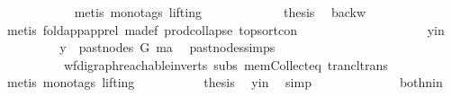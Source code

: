 \begin{isabellebody}
\ \ \ \ \ \ \ \ \ \ \isamarkupfalse%
\ {\isacharparenleft}{\kern0pt}metis\ {\isacharparenleft}{\kern0pt}mono{\isacharunderscore}{\kern0pt}tags{\isacharcomma}{\kern0pt}\ lifting{\isacharparenright}{\kern0pt}{\isacharparenright}{\kern0pt}\ \isanewline
\ \ \ \ \ \ \ \ \isamarkupfalse%
\ \isamarkupfalse%
\ {\isacharquery}{\kern0pt}thesis\ \isamarkupfalse%
\ backw\isanewline
\ \ \ \ \ \ \ \ \ \ \isamarkupfalse%
\ {\isacharparenleft}{\kern0pt}metis\ fold{\isacharunderscore}{\kern0pt}app{\isacharunderscore}{\kern0pt}app{\isacharunderscore}{\kern0pt}rel\ ma{\isacharunderscore}{\kern0pt}def\ prod{\isachardot}{\kern0pt}collapse\ top{\isacharunderscore}{\kern0pt}sort{\isacharunderscore}{\kern0pt}con{\isacharparenright}{\kern0pt}\ \isanewline
\ \ \ \ \ \ \isamarkupfalse%
\isanewline
\ \ \ \ \isamarkupfalse%
\isanewline
\ \ \ \ \ \ \isamarkupfalse%
\ y{\isacharunderscore}{\kern0pt}in\isanewline
\ \ \ \ \ \ \isamarkupfalse%
\ \isamarkupfalse%
\ {\isachardoublequoteopen}y\ {\isasymin}\ past{\isacharunderscore}{\kern0pt}nodes\ G\ ma{\isachardoublequoteclose}\ \isamarkupfalse%
\ past{\isacharunderscore}{\kern0pt}nodes{\isachardot}{\kern0pt}simps\ \isamarkupfalse%
\ {}{\isacharparenleft}{\kern0pt}{}{\isacharcomma}{\kern0pt}{}{\isacharparenright}{\kern0pt}\isanewline
\ \ \ \ \ \ \ \ \ \ wf{\isacharunderscore}{\kern0pt}digraph{\isachardot}{\kern0pt}reachable{}{\isacharunderscore}{\kern0pt}in{\isacharunderscore}{\kern0pt}verts{\isacharparenleft}{\kern0pt}{}{\isacharparenright}{\kern0pt}\ subs\ mem{\isacharunderscore}{\kern0pt}Collect{\isacharunderscore}{\kern0pt}eq\ trancl{\isacharunderscore}{\kern0pt}trans\isanewline
\ \ \ \ \ \ \ \ \isamarkupfalse%
\ {\isacharparenleft}{\kern0pt}metis\ {\isacharparenleft}{\kern0pt}mono{\isacharunderscore}{\kern0pt}tags{\isacharcomma}{\kern0pt}\ lifting{\isacharparenright}{\kern0pt}{\isacharparenright}{\kern0pt}\ \isanewline
\ \ \ \ \ \ \isamarkupfalse%
\ \isamarkupfalse%
\ {\isacharquery}{\kern0pt}thesis\ \isamarkupfalse%
\ y{\isacharunderscore}{\kern0pt}in\ \isamarkupfalse%
\ simp\ \isanewline
\ \ \ \ \isamarkupfalse%
\isanewline
\ \ \ \ \ \ \isamarkupfalse%
\ both{\isacharunderscore}{\kern0pt}nin\isanewline
\ \ \ \ \ \ \isamarkupfalse%

\end{isabellebody}
